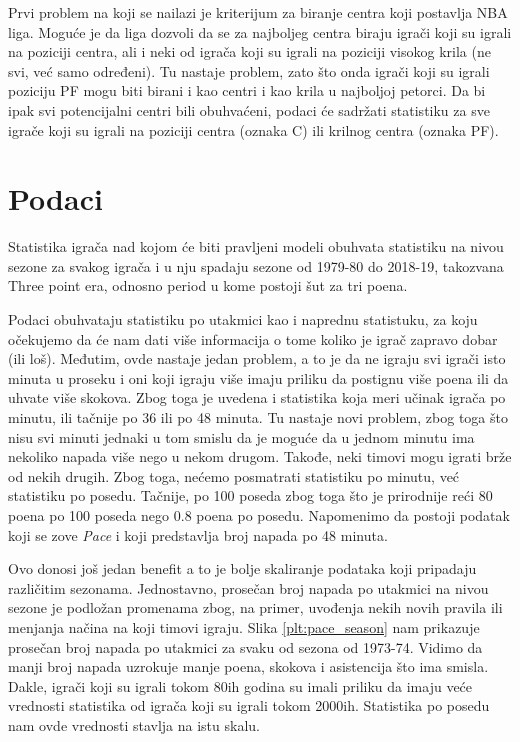 \documentclass[a4paper]{article}
\begin{document}
	Prvi problem na koji se nailazi je kriterijum za biranje centra koji postavlja
NBA liga. Moguće je da liga dozvoli da se za najboljeg centra biraju igrači koji
su igrali na poziciji centra, ali i neki od igrača koji su igrali na poziciji visokog krila (ne svi, već samo određeni). Tu nastaje problem, zato što onda igrači koji su igrali poziciju PF mogu biti birani i kao centri i kao krila u najboljoj petorci. Da bi ipak svi potencijalni centri bili obuhvaćeni, podaci će sadržati statistiku za sve igrače koji su igrali na poziciji centra (oznaka C) ili krilnog centra (oznaka PF).

\section{Podaci}
\label{sec:podaci}

Statistika igrača nad kojom će biti pravljeni modeli obuhvata statistiku na nivou sezone za svakog igrača i u nju spadaju sezone od 1979-80 do 2018-19, takozvana Three point era, odnosno period u kome postoji šut za tri poena.

Podaci obuhvataju statistiku po utakmici kao i naprednu statistuku, za koju
očekujemo da će nam dati više informacija o tome koliko je igrač zapravo dobar (ili loš). Međutim, ovde nastaje jedan problem, a to je da ne igraju svi igrači isto minuta u proseku i oni koji igraju više imaju priliku da postignu više poena ili da uhvate više skokova. Zbog toga je uvedena i statistika koja meri učinak igrača po minutu, ili tačnije po 36 ili po 48 minuta. Tu nastaje novi problem, zbog toga što nisu svi minuti jednaki u tom smislu da je moguće da u jednom minutu ima nekoliko napada više nego u nekom drugom. Takođe, neki timovi mogu igrati brže od nekih drugih. Zbog toga, nećemo posmatrati statistiku po minutu, već statistiku po posedu. Tačnije, po 100 poseda zbog toga što je prirodnije reći 80 poena po 100 poseda nego 0.8 poena po posedu. Napomenimo da postoji podatak koji se zove \textit{Pace} i koji predstavlja broj napada po 48 minuta.

Ovo donosi još jedan benefit a to je bolje skaliranje podataka koji pripadaju različitim sezonama. Jednostavno, prosečan broj napada po utakmici na nivou sezone je podložan promenama zbog, na primer, uvođenja nekih novih pravila ili menjanja načina na koji timovi igraju. Slika \ref{plt:pace_season} nam prikazuje prosečan broj napada po utakmici za svaku od sezona od 1973-74. Vidimo da manji broj napada uzrokuje manje poena, skokova i asistencija što ima smisla. Dakle, igrači koji su igrali tokom 80ih godina su imali priliku da imaju veće vrednosti statistika od igrača koji su igrali tokom 2000ih. Statistika po posedu nam ovde vrednosti stavlja na istu skalu.
\end{document}

